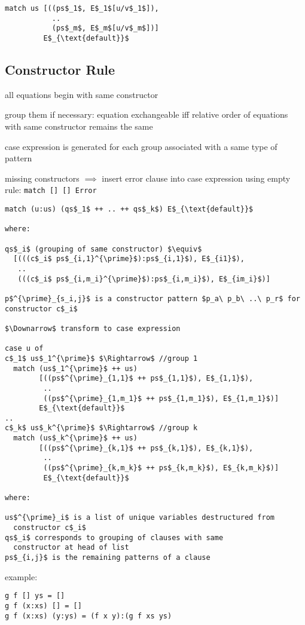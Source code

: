 \documentclass[8pt]{extarticle}
\begin{document}
\begin{multicols*}{2}
\begin{lstlisting}
match us [((ps$_1$, E$_1$[u/v$_1$]),
           ..
           (ps$_m$, E$_m$[u/v$_m$])]
         E$_{\text{default}}$
\end{lstlisting}

\subsection{Constructor Rule}

all equations begin with same constructor

group them if necessary: equation exchangeable iff relative order of equations with same constructor remains the same

case expression is generated for each group associated with a same type of pattern

missing constructors $\implies$ insert error clause into case expression using empty rule: \verb|match [] [] Error|

\begin{lstlisting}
match (u:us) (qs$_1$ ++ .. ++ qs$_k$) E$_{\text{default}}$
  
where:

qs$_i$ (grouping of same constructor) $\equiv$
  [(((c$_i$ ps$_{i,1}^{\prime}$):ps$_{i,1}$), E$_{i1}$),
   ..
   (((c$_i$ ps$_{i,m_i}^{\prime}$):ps$_{i,m_i}$), E$_{im_i}$)]

p$^{\prime}_{s_i,j}$ is a constructor pattern $p_a\ p_b\ ..\ p_r$ for constructor c$_i$

$\Downarrow$ transform to case expression

case u of
c$_1$ us$_1^{\prime}$ $\Rightarrow$ //group 1
  match (us$_1^{\prime}$ ++ us)
        [((ps$^{\prime}_{1,1}$ ++ ps$_{1,1}$), E$_{1,1}$),
         ..
         ((ps$^{\prime}_{1,m_1}$ ++ ps$_{1,m_1}$), E$_{1,m_1}$)]
        E$_{\text{default}}$
..
c$_k$ us$_k^{\prime}$ $\Rightarrow$ //group k
  match (us$_k^{\prime}$ ++ us)
        [((ps$^{\prime}_{k,1}$ ++ ps$_{k,1}$), E$_{k,1}$),
         ..
         ((ps$^{\prime}_{k,m_k}$ ++ ps$_{k,m_k}$), E$_{k,m_k}$)]
         E$_{\text{default}}$

where:
         
us$^{\prime}_i$ is a list of unique variables destructured from
  constructor c$_i$
qs$_i$ corresponds to grouping of clauses with same
  constructor at head of list  
ps$_{i,j}$ is the remaining patterns of a clause
\end{lstlisting}

example:

\begin{lstlisting}
g f [] ys = []
g f (x:xs) [] = []
g f (x:xs) (y:ys) = (f x y):(g f xs ys)


\end{lstlisting}
\end{multicols*}
\end{document}
